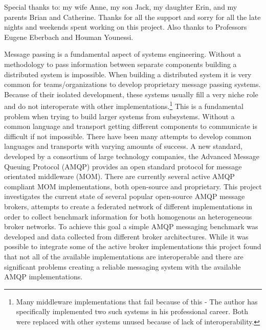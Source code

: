 \documentclass{thesis}
\author{David Joe Wade}
\begin{document}
 
\titlepage            	 %
\tableofcontents          %
\listoffigures         	 %

Special thanks to: my wife Anne, my son Jack, my daughter Erin, and my parents Brian and Catherine.  Thanks for all the support and sorry for all the late nights and weekends spent working on this project.  Also thanks to Professors Eugene Eberbach and Houman Younessi.

Message passing is a fundamental aspect of systems engineering.  Without a methodology to pass information between separate components building a distributed system is impossible.  When building a distributed system it is very common for teams/organizations to develop proprietary message passing systems.  Because of their isolated development, these systems usually fill a very niche role and do not interoperate with other implementations.\footnote{Many middleware implementations that fail because of this - The author has specifically implemented two such systems in his professional career.  Both were replaced with other systems unused because of lack of interoperability.} This is a fundamental problem when trying to build larger systems from subsystems.  Without a common language and transport getting different components to communicate is difficult if not impossible.  There have been many attempts to develop common languages and transports with varying amounts of success.  A new standard, developed by a consortium of large technology companies, the Advanced Message Queuing Protocol (AMQP) provides an open standard protocol for message orientated middleware (MOM).  There are currently several active AMQP compliant MOM implementations, both open-source and proprietary.  This project investigates the current state of several popular open-source AMQP message brokers, attempts to create a federated network of different implementations in order to collect benchmark information for both homogenous an heterogeneous broker networks.  To achieve this goal a simple AMQP messaging benchmark was developed and data collected from different broker architectures.  While it was possible to integrate some of the active broker implementations this project found that not all of the available implementations are interoperable and there are significant problems creating a reliable messaging system with the available AMQP implementations.  
\end{document}
